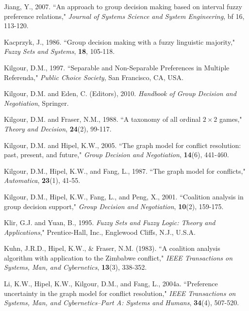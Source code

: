 \documentclass[letterpaper,12pt,titlepage,oneside,final]{book}
\begin{document}
\begin{thebibliography}{}
Jiang, Y., 2007. ``An approach to group decision making based on interval fuzzy preference relations," \emph{Journal of Systems Science and System Engineering}, {bf 16}, 113-120.

Kacprzyk, J., 1986. ``Group decision making with a fuzzy linguistic majority," \emph{Fuzzy Sets and Systems}, {\bf 18}, 105-118.


Kilgour, D.M., 1997. ``Separable and Non-Separable Preferences in Multiple Referenda," \emph{Public Choice Society}, San Francisco, CA, USA.

Kilgour, D.M. and Eden, C. (Editors), 2010. \emph{Handbook of Group Decision and Negotiation}, Springer.

Kilgour, D.M. and Fraser, N.M., 1988. ``A taxonomy of all ordinal $2 \times 2$ games," \emph{Theory and Decision}, {\bf 24}(2), 99-117.

Kilgour, D.M. and Hipel, K.W., 2005. ``The graph model for conflict resolution: past, present, and future," \emph{Group Decision and Negotiation}, {\bf 14}(6), 441-460.

Kilgour, D.M., Hipel, K.W., and Fang, L., 1987. ``The graph model for conflicts," \emph{Automatica}, {\bf 23}(1), 41-55.

Kilgour, D.M., Hipel, K.W., Fang, L., and Peng, X., 2001. ``Coalition analysis in group decision support," \emph{Group Decision and Negotiation}, {\bf 10}(2), 159-175.

Klir, G.J. and Yuan, B., 1995. \emph{Fuzzy Sets and Fuzzy Logic: Theory and Applications}," Prentice-Hall, Inc., Englewood Cliffs, N.J., U.S.A.

Kuhn, J.R.D., Hipel, K.W., \& Fraser, N.M. (1983). ``A coalition analysis algorithm with application to the Zimbabwe conflict," \emph{IEEE Transactions on Systems, Man, and Cybernetics}, {\bf 13}(3), 338-352.

Li, K.W., Hipel, K.W., Kilgour, D.M., and Fang, L., 2004a. ``Preference uncertainty in the graph model for conflict resolution," \emph{IEEE Transactions on Systems, Man, and Cybernetics--Part A: Systems and Humans}, {\bf 34}(4), 507-520.


\end{thebibliography}
\end{document}
